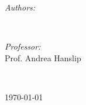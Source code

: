 \documentclass[12pt]{article}
\begin{document}
\begin{titlepage}

\begin{minipage}{0.4\textwidth}
\begin{flushleft} \large
\emph{Authors:}\\
\@author 
\end{flushleft}
\end{minipage}
~
\begin{minipage}{0.4\textwidth}
\begin{flushright} \large
\emph{Professor:} \\
Prof. Andrea Hanslip \\[1.2em] %

\end{flushright}
\end{minipage}\\[2cm]
\makeatother



{\large \today}\\[2cm] %

\vfill %

\end{titlepage}
\renewcommand{\abstractname}{Executive Summary}
\end{document}
